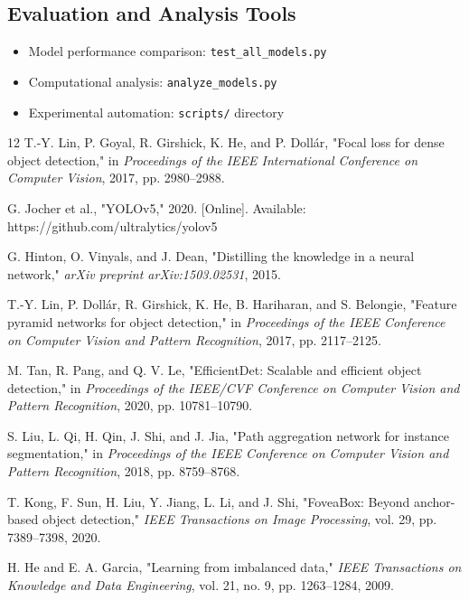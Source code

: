 \documentclass[journal]{IEEEtran}
\begin{document}
\subsection{Evaluation and Analysis Tools}
\begin{itemize}
\item Model performance comparison: \texttt{test\_all\_models.py}
\item Computational analysis: \texttt{analyze\_models.py}
\item Experimental automation: \texttt{scripts/} directory
\end{itemize}

\begin{thebibliography}{12}
T.-Y. Lin, P. Goyal, R. Girshick, K. He, and P. Dollár, "Focal loss for dense object detection," in \textit{Proceedings of the IEEE International Conference on Computer Vision}, 2017, pp. 2980--2988.

G. Jocher et al., "YOLOv5," 2020. [Online]. Available: https://github.com/ultralytics/yolov5

G. Hinton, O. Vinyals, and J. Dean, "Distilling the knowledge in a neural network," \textit{arXiv preprint arXiv:1503.02531}, 2015.

T.-Y. Lin, P. Dollár, R. Girshick, K. He, B. Hariharan, and S. Belongie, "Feature pyramid networks for object detection," in \textit{Proceedings of the IEEE Conference on Computer Vision and Pattern Recognition}, 2017, pp. 2117--2125.

M. Tan, R. Pang, and Q. V. Le, "EfficientDet: Scalable and efficient object detection," in \textit{Proceedings of the IEEE/CVF Conference on Computer Vision and Pattern Recognition}, 2020, pp. 10781--10790.

S. Liu, L. Qi, H. Qin, J. Shi, and J. Jia, "Path aggregation network for instance segmentation," in \textit{Proceedings of the IEEE Conference on Computer Vision and Pattern Recognition}, 2018, pp. 8759--8768.

T. Kong, F. Sun, H. Liu, Y. Jiang, L. Li, and J. Shi, "FoveaBox: Beyond anchor-based object detection," \textit{IEEE Transactions on Image Processing}, vol. 29, pp. 7389--7398, 2020.

H. He and E. A. Garcia, "Learning from imbalanced data," \textit{IEEE Transactions on Knowledge and Data Engineering}, vol. 21, no. 9, pp. 1263--1284, 2009.


\end{thebibliography}
\end{document}
